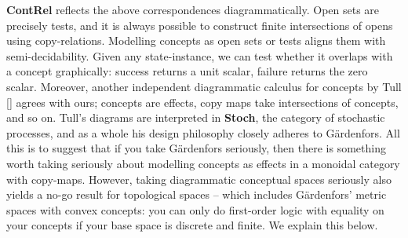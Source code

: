 \begin{fullwidth}
\textbf{ContRel} reflects the above correspondences diagrammatically. Open sets are precisely tests, and it is always possible to construct finite intersections of opens using copy-relations. Modelling concepts as open sets or tests aligns them with semi-decidability. Given any state-instance, we can test whether it overlaps with a concept graphically: success returns a unit scalar, failure returns the zero scalar. Moreover, another independent diagrammatic calculus for concepts by Tull [] agrees with ours; concepts are effects, copy maps take intersections of concepts, and so on. Tull's diagrams are interpreted in \textbf{Stoch}, the category of stochastic processes, and as a whole his design philosophy closely adheres to G\"{a}rdenfors. All this is to suggest that if you take G\"{a}rdenfors seriously, then there is something worth taking seriously about modelling concepts as effects in a monoidal category with copy-maps. However, taking diagrammatic conceptual spaces seriously also yields a no-go result for topological spaces -- which includes G\"{a}rdenfors' metric spaces with convex concepts: you can only do first-order logic with equality on your concepts if your base space is discrete and finite. We explain this below.\\


\end{fullwidth}
